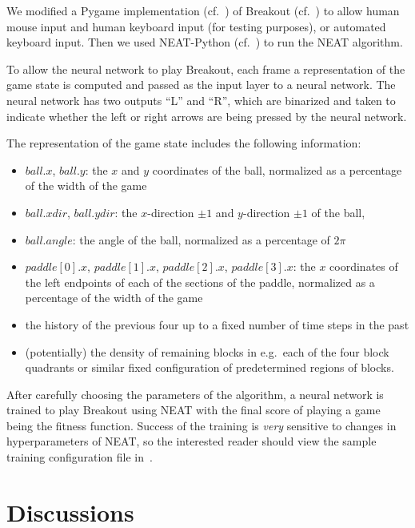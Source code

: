 \documentclass[letterpaper, twocolumn]{article}
\begin{document}
We modified a Pygame implementation (cf.~\cite{pygame}) of Breakout (cf.~\cite{max00355breakout}) to allow
human mouse input and human keyboard input (for testing purposes), or automated keyboard input.
Then we used NEAT-Python (cf.~\cite{neatpython}) to run the NEAT algorithm.

To allow the neural network to play Breakout,
each frame a representation of the game state is computed and
passed as the input layer to a neural network.
The neural network has two outputs ``L'' and ``R'', which are binarized
and taken to indicate whether the left or right arrows are being pressed by the neural network.

The representation of the game state includes the following information:
\begin{itemize}
    \item{} $ball.x$, $ball.y$: the $x$ and $y$ coordinates of the ball, normalized as a percentage of the width of the game
    \item{} $ball.xdir$, $ball.ydir$: the $x$-direction $\pm1$ and $y$-direction $\pm 1$ of the ball,
    \item{} $ball.angle$: the angle of the ball, normalized as a percentage of $2\pi$
    \item{} $paddle[0].x$, $paddle[1].x$, $paddle[2].x$, $paddle[3].x$: the $x$
	    coordinates of the left endpoints of each of the sections of
		the paddle, normalized as a percentage of the width of the game
    \item{} the history of the previous four up to a fixed number of time steps in the past
    \item{} (potentially) the density of remaining blocks in e.g.\ each of the four block quadrants or similar fixed configuration of predetermined regions of blocks.
\end{itemize}

After carefully choosing the parameters of the algorithm, a neural network
is trained to play Breakout using NEAT with the final score of playing a game
being the fitness function.
Success of the training is \emph{very} sensitive to changes in hyperparameters
of NEAT, so the interested reader should view the sample training configuration
file in~\cite{neatbreakout}.

\section{Discussions}
\end{document}
